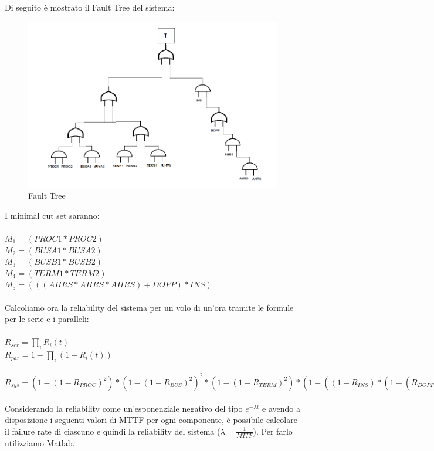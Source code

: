 	Di seguito è mostrato il Fault Tree del sistema:
	
	\begin{figure}[H]
		\centering
		\includegraphics[scale=0.7]{./immagine/fault_tree_es5.png}
		\caption{Fault Tree}
		\label{fig:fault_tree_es5}
	\end{figure}
	
	I minimal cut set saranno:\\\\
	$ M_{1}=(PROC1*PROC2)$\\
	$M_{2}=(BUSA1*BUSA2)$\\$M_{3}=(BUSB1*BUSB2)$\\$M_{4}=(TERM1*TERM2)$\\$M_{5}=(((AHRS*AHRS*AHRS)+DOPP)*INS) $\\\\
	Calcoliamo ora la reliability del sistema per un volo di un'ora tramite le formule per le serie e i paralleli:\\\\
	$ R_{ser}=\prod_{i}^{}R_{i}(t) $\\
	$ R_{par}=1-\prod_{i}^{}(1-R_{i}(t)) $\\\\
	$ R_{sys}=(1-(1-R_{PROC})^{2})*(1-(1-R_{BUS})^{2})^{2}*(1-(1-R_{TERM})^{2})*(1-((1-R_{INS})*(1-(R_{DOPP}*(1-(1-R_{AHRS})^{3}))))) $\\\\
	
	Considerando la reliability come un'esponenziale negativo del tipo $ e^{-\lambda t} $ e avendo a disposizione i seguenti valori di MTTF per ogni componente, è possibile calcolare il failure rate di ciascuno e quindi la reliability del sistema ($\lambda=\frac{1}{MTTF}$). Per farlo utilizziamo Matlab.
	
